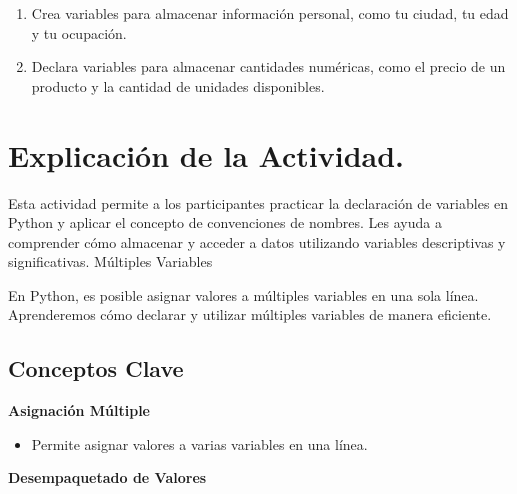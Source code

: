 \documentclass[
  a4paper,
  DIV=11,
  numbers=noendperiod,
  onepage,
  openany]{scrreprt}
\providecommand{\tightlist}{%
  \setlength{\itemsep}{0pt}\setlength{\parskip}{0pt}}\usepackage{longtable,booktabs,array}
\begin{document}
\begin{tcolorbox}[enhanced jigsaw, toptitle=1mm, toprule=.15mm, title=\textcolor{quarto-callout-tip-color}{\faLightbulb}\hspace{0.5em}{Actividad Práctica}, colbacktitle=quarto-callout-tip-color!10!white, opacitybacktitle=0.6, titlerule=0mm, colback=white, left=2mm, bottomrule=.15mm, breakable, bottomtitle=1mm, rightrule=.15mm, colframe=quarto-callout-tip-color-frame, arc=.35mm, leftrule=.75mm, coltitle=black, opacityback=0]

\begin{enumerate}
\def\labelenumi{\arabic{enumi}.}
\item
  Crea variables para almacenar información personal, como tu ciudad, tu
  edad y tu ocupación.
\item
  Declara variables para almacenar cantidades numéricas, como el precio
  de un producto y la cantidad de unidades disponibles.
\end{enumerate}

\end{tcolorbox}

\section{Explicación de la
Actividad.}\label{explicaciuxf3n-de-la-actividad.}

Esta actividad permite a los participantes practicar la declaración de
variables en Python y aplicar el concepto de convenciones de nombres.
Les ayuda a comprender cómo almacenar y acceder a datos utilizando
variables descriptivas y significativas. Múltiples Variables

En Python, es posible asignar valores a múltiples variables en una sola
línea. Aprenderemos cómo declarar y utilizar múltiples variables de
manera eficiente.

\subsection{Conceptos Clave}\label{conceptos-clave-5}

\textbf{Asignación Múltiple}

\begin{itemize}
\tightlist
\item
  Permite asignar valores a varias variables en una línea.
\end{itemize}

\textbf{Desempaquetado de Valores}
\end{document}
